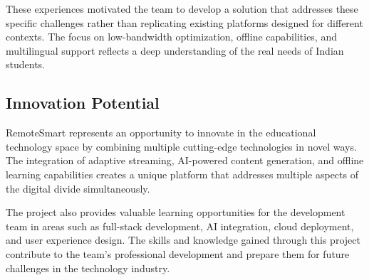 \documentclass[12pt,a4paper]{report}
\begin{document}
These experiences motivated the team to develop a solution that addresses these specific challenges rather than replicating existing platforms designed for different contexts. The focus on low-bandwidth optimization, offline capabilities, and multilingual support reflects a deep understanding of the real needs of Indian students.

\subsection{Innovation Potential}

RemoteSmart represents an opportunity to innovate in the educational technology space by combining multiple cutting-edge technologies in novel ways. The integration of adaptive streaming, AI-powered content generation, and offline learning capabilities creates a unique platform that addresses multiple aspects of the digital divide simultaneously.

The project also provides valuable learning opportunities for the development team in areas such as full-stack development, AI integration, cloud deployment, and user experience design. The skills and knowledge gained through this project contribute to the team's professional development and prepare them for future challenges in the technology industry.
\end{document}
